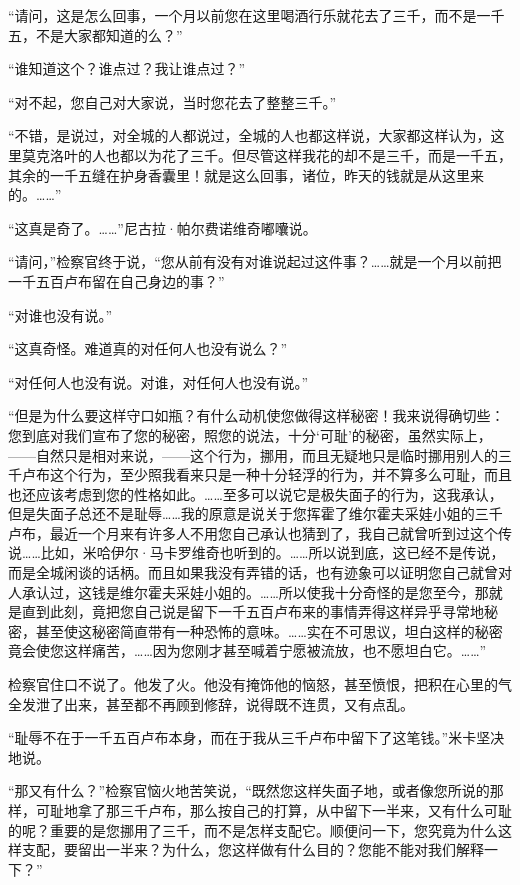\par “请问，这是怎么回事，一个月以前您在这里喝酒行乐就花去了三千，而不是一千五，不是大家都知道的么？”
\par “谁知道这个？谁点过？我让谁点过？”
\par “对不起，您自己对大家说，当时您花去了整整三千。”
\par “不错，是说过，对全城的人都说过，全城的人也都这样说，大家都这样认为，这里莫克洛叶的人也都以为花了三千。但尽管这样我花的却不是三千，而是一千五，其余的一千五缝在护身香囊里！就是这么回事，诸位，昨天的钱就是从这里来的。……”
\par “这真是奇了。……”尼古拉·帕尔费诺维奇嘟囔说。
\par “请问，”检察官终于说，“您从前有没有对谁说起过这件事？……就是一个月以前把一千五百卢布留在自己身边的事？”
\par “对谁也没有说。”
\par “这真奇怪。难道真的对任何人也没有说么？”
\par “对任何人也没有说。对谁，对任何人也没有说。”
\par “但是为什么要这样守口如瓶？有什么动机使您做得这样秘密！我来说得确切些：您到底对我们宣布了您的秘密，照您的说法，十分‘可耻’的秘密，虽然实际上，——自然只是相对来说，——这个行为，挪用，而且无疑地只是临时挪用别人的三千卢布这个行为，至少照我看来只是一种十分轻浮的行为，并不算多么可耻，而且也还应该考虑到您的性格如此。……至多可以说它是极失面子的行为，这我承认，但是失面子总还不是耻辱……我的原意是说关于您挥霍了维尔霍夫采娃小姐的三千卢布，最近一个月来有许多人不用您自己承认也猜到了，我自己就曾听到过这个传说……比如，米哈伊尔·马卡罗维奇也听到的。……所以说到底，这已经不是传说，而是全城闲谈的话柄。而且如果我没有弄错的话，也有迹象可以证明您自己就曾对人承认过，这钱是维尔霍夫采娃小姐的。……所以使我十分奇怪的是您至今，那就是直到此刻，竟把您自己说是留下一千五百卢布来的事情弄得这样异乎寻常地秘密，甚至使这秘密简直带有一种恐怖的意味。……实在不可思议，坦白这样的秘密竟会使您这样痛苦，……因为您刚才甚至喊着宁愿被流放，也不愿坦白它。……”
\par 检察官住口不说了。他发了火。他没有掩饰他的恼怒，甚至愤恨，把积在心里的气全发泄了出来，甚至都不再顾到修辞，说得既不连贯，又有点乱。
\par “耻辱不在于一千五百卢布本身，而在于我从三千卢布中留下了这笔钱。”米卡坚决地说。
\par “那又有什么？”检察官恼火地苦笑说，“既然您这样失面子地，或者像您所说的那样，可耻地拿了那三千卢布，那么按自己的打算，从中留下一半来，又有什么可耻的呢？重要的是您挪用了三千，而不是怎样支配它。顺便问一下，您究竟为什么这样支配，要留出一半来？为什么，您这样做有什么目的？您能不能对我们解释一下？”
